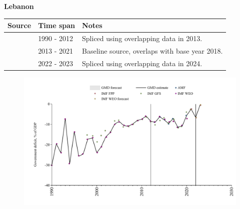 \documentclass[12pt,a4paper,landscape]{article}
\begin{document}
\begin{adjustbox}{max totalsize={\paperwidth}{\paperheight},center}
\begin{minipage}[t][\textheight][t]{\textwidth}
\vspace*{0.5cm}
{}
\begin{center}
{\Large\bfseries Lebanon}
\end{center}
\vspace{0.5cm}
\begin{table}[H]
\centering
\small
\begin{tabular}{|l|l|l|}
\hline
\textbf{Source} & \textbf{Time span} & \textbf{Notes} \\
\hline
\rowcolor{white}\cite{IMF_WEO}& 1990 - 2012 &Spliced using overlapping data in 2013.\\
\rowcolor{lightgray}\cite{AMF}& 2013 - 2021 &Baseline source, overlaps with base year 2018.\\
\rowcolor{white}\cite{IMF_FPP}& 2022 - 2023 &Spliced using overlapping data in 2024.\\
\hline
\end{tabular}
\end{table}
\begin{figure}[H]
\centering
\includegraphics[width=\textwidth,height=0.6\textheight,keepaspectratio]{graphs/LBN_govdef_GDP.pdf}
\end{figure}
\end{minipage}
\end{adjustbox}
\end{document}
